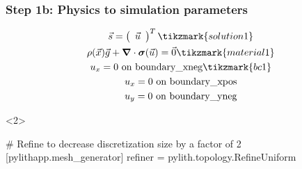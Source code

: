 \documentclass[aspectratio=169]{beamer}
\begin{document}
\begin{frame}[t,fragile]
  \frametitle{Step 1b: Physics to simulation parameters}
  \summary{}

  \begin{minipage}[t]{0.3\textwidth}
    {\scriptsize
    \begin{gather*}
    \vec{s} = \left(\begin{array}{c} \vec{u} \end{array}\right)^T \tikzmark{solution1}\\
    \rho(\vec{x}) \vec{g} + \tensor{\nabla} \cdot \tensor{\sigma}(\vec{u}) = \vec{0} \tikzmark{material1}\\
    u_x = 0 \text{ on boundary\_xneg} \tikzmark{bc1}\\
    u_x = 0 \text{ on boundary\_xpos} \\
    u_y = 0 \text{ on boundary\_yneg} \\
    \end{gather*}}
  \end{minipage}
  \hfill
  \begin{minipage}[t]{0.67\textwidth}
    \begin{onlyenv}<2>
      \begin{cfgcode}
        # Refine to decrease discretization size by a factor of 2
        [pylithapp.mesh_generator]
        refiner = pylith.topology.RefineUniform
      \end{cfgcode}
    \end{onlyenv}
  \end{minipage}

  
\end{frame}
\end{document}
